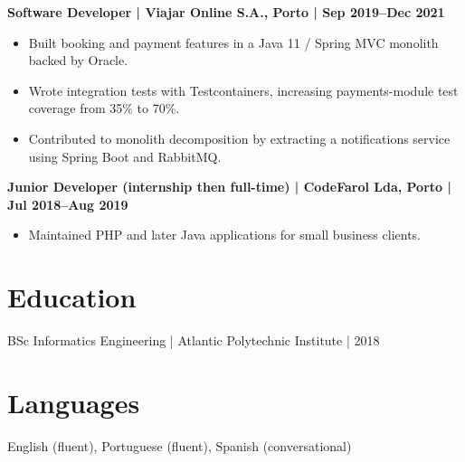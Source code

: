 \documentclass[11pt,a4paper]{article}
\begin{document}
\textbf{Software Developer | Viajar Online S.A., Porto | Sep 2019–Dec 2021}
\begin{itemize}
\item Built booking and payment features in a Java 11 / Spring MVC monolith backed by Oracle.
\item Wrote integration tests with Testcontainers, increasing payments-module test coverage from 35\% to 70\%.
\item Contributed to monolith decomposition by extracting a notifications service using Spring Boot and RabbitMQ.
\end{itemize}

\textbf{Junior Developer (internship then full-time) | CodeFarol Lda, Porto | Jul 2018–Aug 2019}
\begin{itemize}
\item Maintained PHP and later Java applications for small business clients.
\end{itemize}

\section*{Education}
BSc Informatics Engineering | Atlantic Polytechnic Institute | 2018

\section*{Languages}
English (fluent), Portuguese (fluent), Spanish (conversational)
\end{document}
